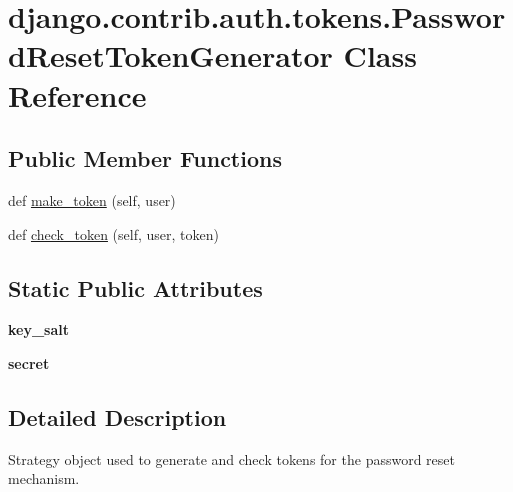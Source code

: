 \hypertarget{classdjango_1_1contrib_1_1auth_1_1tokens_1_1_password_reset_token_generator}{}\section{django.\+contrib.\+auth.\+tokens.\+Password\+Reset\+Token\+Generator Class Reference}
\label{classdjango_1_1contrib_1_1auth_1_1tokens_1_1_password_reset_token_generator}
\subsection*{Public Member Functions}
\begin{DoxyCompactItemize}
\item 
def \mbox{\hyperlink{classdjango_1_1contrib_1_1auth_1_1tokens_1_1_password_reset_token_generator_a95b41316cc1fc2d52538b367f7f52f2f}{make\+\_\+token}} (self, user)
\item 
def \mbox{\hyperlink{classdjango_1_1contrib_1_1auth_1_1tokens_1_1_password_reset_token_generator_aed5eccad265846d0931ac06a59b788f2}{check\+\_\+token}} (self, user, token)
\end{DoxyCompactItemize}
\subsection*{Static Public Attributes}
\begin{DoxyCompactItemize}
\item 
\mbox{\label{classdjango_1_1contrib_1_1auth_1_1tokens_1_1_password_reset_token_generator_a9993888dbca927ab2e638e3a75cbbf6e}} 
{\bfseries key\+\_\+salt}
\item 
\mbox{\label{classdjango_1_1contrib_1_1auth_1_1tokens_1_1_password_reset_token_generator_a071cadab785aec3ffd0c0cacf58a5cf0}} 
{\bfseries secret}
\end{DoxyCompactItemize}


\subsection{Detailed Description}
\begin{DoxyVerb}Strategy object used to generate and check tokens for the password
reset mechanism.
\end{DoxyVerb}
 

